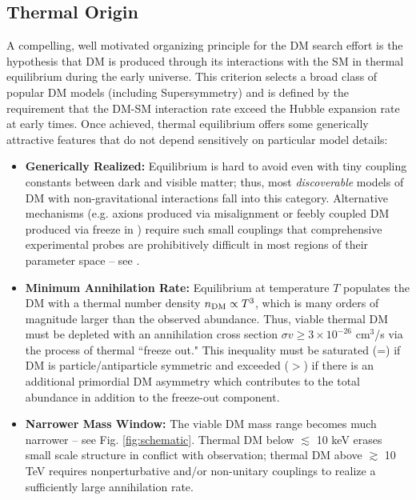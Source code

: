 \subsection{Thermal Origin}
A compelling, well motivated organizing principle for the DM search effort is the hypothesis that DM
is produced through its interactions with the SM in thermal equilibrium during the early universe. This criterion
selects a broad class of popular DM models (including Supersymmetry) and is defined by the requirement that the DM-SM 
interaction rate exceed the Hubble expansion rate at early times.  
Once achieved, thermal equilibrium offers some generically attractive features that do not depend sensitively
on particular model details:
\begin{itemize}
\item {\bf Generically Realized:} Equilibrium is hard to avoid even with tiny coupling constants  between 
dark and visible matter; thus, most {\it discoverable} models of DM with non-gravitational interactions fall into this category. 
Alternative mechanisms (e.g. axions produced via misalignment \cite{Visinelli:2009zm} or feebly coupled DM produced via freeze in \cite{Hall:2009bx}) require such small couplings
that comprehensive experimental probes are prohibitively difficult in most regions of their parameter space -- see \cite{Essig:2013lka}.
\item {\bf Minimum Annihilation Rate:}  Equilibrium at temperature $T$ populates the DM with a  thermal number density $n_{\rm DM} \propto T^3$, which is many orders of magnitude larger than the observed abundance. Thus, viable thermal DM must be depleted with an annihilation cross section $\sigma v \ge 3\times10^{-26}$ cm$^3$/s via
the process of thermal ``freeze out." This inequality must be saturated (=) if DM is particle/antiparticle symmetric and exceeded ($>$)  if there is an additional primordial DM asymmetry which contributes to the total abundance in addition to the freeze-out component.

\item {\bf Narrower Mass Window: }The viable DM mass range becomes much narrower -- see Fig. \ref{fig:schematic}.
Thermal DM below $\lesssim$ 10 keV erases small scale structure in conflict with observation; 
thermal DM above $\gtrsim$ 10 TeV requires nonperturbative and/or non-unitary couplings to realize
a sufficiently large annihilation rate. 
\end{itemize}

